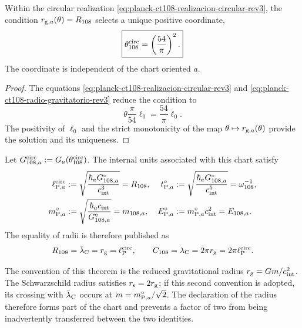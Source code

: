 \begin{proposition}
\label{prop:selector-circular-planck-ct108-rev3}
Within the circular realization
\eqref{eq:planck-ct108-realizacion-circular-rev3}, the condition
\(r_{{\rm g},a}(\theta)=R_{108}\) selects a unique positive coordinate,
\begin{equation}
 \boxed{\theta_{108}^{\rm circ}=\left(\frac{54}{\pi}\right)^2.}
 \label{eq:theta-circular-planck-ct108-rev3}
\end{equation}
The coordinate is independent of the chart oriented \(a\).
\end{proposition}

\begin{proof}
The equations
\eqref{eq:planck-ct108-realizacion-circular-rev3} and
\eqref{eq:planck-ct108-radio-gravitatorio-rev3} reduce the condition to
\[
 \theta\frac{\pi}{54}\ell_0=\frac{54}{\pi}\ell_0.
\]
The positivity of \(\ell_0\) and the strict monotonicity of the map
\(\theta\mapsto r_{{\rm g},a}(\theta)\) provide the solution and its
uniqueness.
\end{proof}

Let \(G_{108,a}^{\rm circ}:=G_a(\theta_{108}^{\rm circ})\). The internal units
associated with this chart satisfy
\begin{align}
 \ell_{{\rm P},a}^{\rm circ}
 &:=\sqrt{\frac{\hbar_a G_{108,a}^{\circ}}{c_{\rm int}^{3}}}
 =R_{108},
 &
 t_{{\rm P},a}^{\circ}
 &:=\sqrt{\frac{\hbar_a G_{108,a}^{\circ}}{c_{\rm int}^{5}}}
 =\omega_{108}^{-1},
 \label{eq:planck-ct108-longitud-tiempo-rev3}\\
 m_{{\rm P},a}^{\circ}
 &:=\sqrt{\frac{\hbar_a c_{\rm int}}{G_{108,a}^{\circ}}}
 =m_{108,a},
 &
 E_{{\rm P},a}^{\circ}
 &:=m_{{\rm P},a}^{\circ}c_{\rm int}^{2}=E_{108,a}.
 \label{eq:planck-ct108-masa-energia-rev3}
\end{align}
The equality of radii is therefore published as
\begin{equation}
 R_{108}=\bar\lambda_{\rm C}=r_{\rm g}=\ell_{\rm P}^{\rm circ},
 \qquad
 C_{108}=\lambda_{\rm C}=2\pi r_{\rm g}=2\pi\ell_{\rm P}^{\rm circ}.
 \label{eq:planck-ct108-tres-lectores-rev3}
\end{equation}

The convention of this theorem is the reduced gravitational radius
\(r_{\rm g}=Gm/c_{\rm int}^{2}\). The Schwarzschild radius satisfies
\(r_{\rm s}=2r_{\rm g}\); if this second convention is adopted, its crossing with
\(\bar\lambda_{\rm C}\) occurs at
\(m=m_{{\rm P},a}^{\circ}/\sqrt2\). The declaration of the radius therefore forms
part of the chart and prevents a factor of two from being inadvertently transferred
between the two identities.

